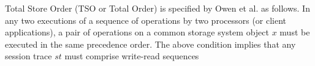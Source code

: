 \documentclass{sig-alternate-05-2015}
\begin{document}
\par Total Store Order (TSO or Total Order) is specified by Owen et al. \cite{Owens:2009:BXM:1616077.1616107}
 as follows. In any two executions of a sequence of operations by two processors (or client applications),
 a pair of operations on a common storage system object $x$ must be executed in the same precedence order.  %
 The above condition implies that any session trace $\mathit{st}$ must comprise write-read sequences
\end{document}
